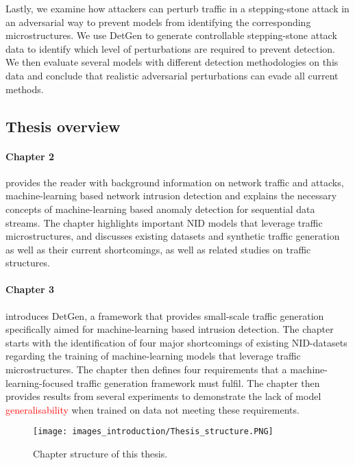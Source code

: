 Lastly, we examine how attackers can perturb traffic in a stepping-stone attack in an adversarial way to prevent models from identifying the corresponding microstructures. We use DetGen to generate controllable stepping-stone attack data to identify which level of perturbations are required to prevent detection. We then evaluate several models with different detection methodologies on this data and conclude that realistic adversarial perturbations can evade all current methods.

\subsection{Thesis overview}

\paragraph*{Chapter 2} provides the reader with background information on network traffic and attacks, machine-learning based network intrusion detection and explains the necessary concepts of machine-learning based anomaly detection for sequential data streams. The chapter highlights important NID models that leverage traffic microstructures, and discusses existing datasets and synthetic traffic generation as well as their current shortcomings, as well as related studies on traffic structures.

\paragraph*{Chapter 3} introduces DetGen, a framework that provides small-scale traffic generation specifically aimed for machine-learning based intrusion detection. The chapter starts with the identification of four major shortcomings of existing NID-datasets regarding the training of machine-learning models that leverage traffic microstructures. The chapter then defines four requirements that a machine-learning-focused traffic generation framework must fulfil. The chapter then provides results from several experiments to demonstrate the lack of model \textcolor{red}{generalisability} when trained on data not meeting these requirements. 

\begin{figure}[t]
\centering
\texttt{[image: images\_introduction/Thesis\_structure.PNG]}
\caption{Chapter structure of this thesis.}\label{Fig:structure}
\end{figure}

